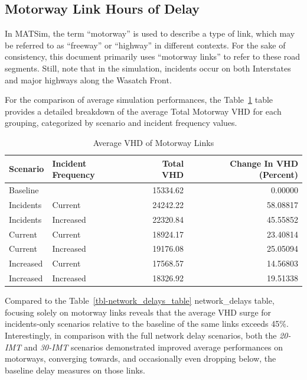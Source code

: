 \documentclass[fancy, oneside, mastersfancy, ms]{byuthesis}
\begin{document}
\hypertarget{motorway-link-hours-of-delay}{%
\subsection{Motorway Link Hours of
Delay}\label{motorway-link-hours-of-delay}}

In MATSim, the term ``motorway'' is used to describe a type of link,
which may be referred to as ``freeway'' or ``highway'' in different
contexts. For the sake of consistency, this document primarily uses
``motorway links'' to refer to these road segments. Still, note that in
the simulation, incidents occur on both Interstates and major highways
along the Wasatch Front.

For the comparison of average simulation performances, the
Table~\ref{tbl-motorway_delays_table} table provides a detailed
breakdown of the average Total Motorway VHD for each grouping,
categorized by scenario and incident frequency values.

\hypertarget{tbl-motorway_delays_table}{}
\begin{table}
\caption{\label{tbl-motorway_delays_table}Average VHD of Motorway Links }\tabularnewline

\centering
\begin{tabular}[t]{llrr}
\toprule
Scenario & Incident Frequency & Total VHD & Change In VHD (Percent)\\
\midrule
Baseline &  & 15334.62 & 0.00000\\
Incidents & Current & 24242.22 & 58.08817\\
Incidents & Increased & 22320.84 & 45.55852\\
Current & Current & 18924.17 & 23.40814\\
Current & Increased & 19176.08 & 25.05094\\
\addlinespace
Increased & Current & 17568.57 & 14.56803\\
Increased & Increased & 18326.92 & 19.51338\\
\bottomrule
\end{tabular}
\end{table}

Compared to the Table~\ref{tbl-network_delays_table} network\_delays
table, focusing solely on motorway links reveals that the average VHD
surge for incidents-only scenarios relative to the baseline of the same
links exceeds 45\%. Interestingly, in comparison with the full network
delay scenarios, both the \emph{20-IMT} and \emph{30-IMT} scenarios
demonstrated improved average performances on motorways, converging
towards, and occasionally even dropping below, the baseline delay
measures on those links.
\end{document}
